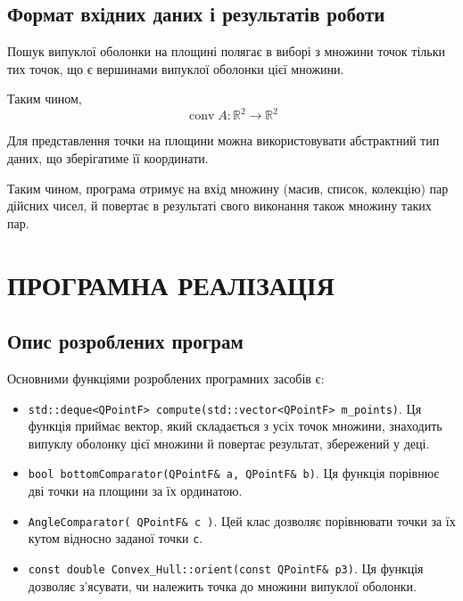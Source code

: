 \documentclass[simple,14pt,utf8,ukrainian]{eskdtext}
\begin{document}
  \subsection{Формат вхідних даних і результатів роботи}
    Пошук випуклої оболонки на площині полягає в виборі з множини точок тільки
    тих точок, що є вершинами випуклої оболонки цієї множини.

    Таким чином,
    \begin{equation}
      \mathop{conv} A : \mathbb{R}^2 \rightarrow \mathbb{R}^2
      \label{eq:1}
    \end{equation}

    Для представлення точки на площини можна використовувати абстрактний тип
    даних, що зберігатиме її координати.

    Таким чином, програма отримує на вхід множину (масив, список, колекцію)
    пар дійсних чисел, й повертає в результаті свого виконання також множину
    таких пар.

\newpage
\section{ПРОГРАМНА РЕАЛІЗАЦІЯ}
  \subsection{Опис розроблених програм}
    Основними функціями розроблених програмних засобів є:
    \begin{itemize}
      \item \verb'std::deque<QPointF> compute(std::vector<QPointF> m_points)'.
        Ця функція приймає вектор, який складається з усіх точок множини,
        знаходить випуклу оболонку цієї множини й повертає результат,
        збережений у деці.
      \item \verb'bool bottomComparator(QPointF& a, QPointF& b)'.
        Ця функція порівнює дві точки на площини за їх ординатою.
      \item \verb'AngleComparator( QPointF& c )'.
        Цей клас дозволяє порівнювати точки за їх кутом відносно заданої точки
        \verb'c'.
      \item \verb'const double Convex_Hull::orient(const QPointF& p3)'.
        Ця функція дозволяє з’ясувати, чи належить точка до множини випуклої
        оболонки.
    \end{itemize}
\end{document}
